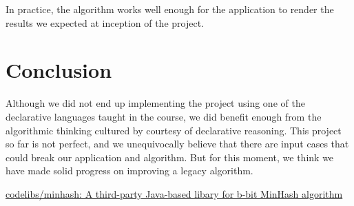 \documentclass{article}
\begin{document}
In practice, the algorithm works well enough for the application to render the results we expected at inception of the project. 

\section{Conclusion}
Although we did not end up implementing the project using one of the declarative languages taught in the course, we did benefit enough from the algorithmic thinking cultured by courtesy of declarative reasoning. This project so far is not perfect, and we unequivocally believe that there are input cases that could break our application and algorithm. But for this moment, we think we have made solid progress on improving a legacy algorithm. 






\begin{thebibliography}{9}
      \href{https://github.com/codelibs/minhash}{codelibs/minhash: A third-party Java-based libary  for b-bit MinHash algorithm}


\end{thebibliography} %
\end{document}
